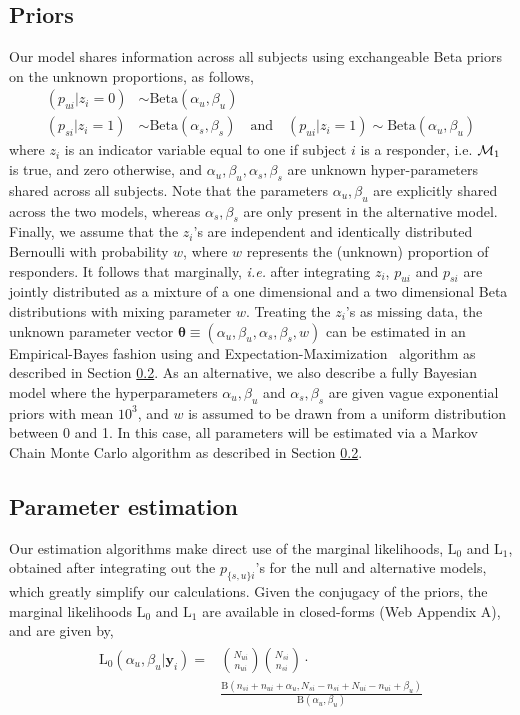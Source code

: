 \documentclass[useAMS,referee,usenatbib]{biom}
\begin{document}
\subsection{Priors}
\label{ss:priors}
Our model shares information across all subjects using exchangeable Beta priors on the unknown proportions, as follows, 
 \begin{align*}
(p_{ui} | z_{i}=0)  &\sim \mathrm{Beta}(\alpha_u, \beta_u)\\
(p_{si} | z_{i}=1)  &\sim \mathrm{Beta}(\alpha_s,\beta_s) \quad\mathrm{and}\quad (p_{ui}|z_{i}=1) \sim \mathrm{Beta}(\alpha_u, \beta_u)
 \end{align*}
where $z_i$ is an indicator variable equal to one if subject $i$ is a responder, i.e.  ${\cal M}_1$ is true, and zero otherwise, and $\alpha_u, \beta_u, \alpha_s,\beta_s$ are unknown hyper-parameters shared across all subjects. Note that the parameters $\alpha_u, \beta_u$ are explicitly shared across the two models, whereas $\alpha_s,\beta_s$ are only present in the alternative model. Finally, we assume that the $z_i$'s are independent and identically distributed Bernoulli with probability $w$, where $w$ represents the (unknown) proportion of responders. It follows that marginally, \textit{i.e.} after integrating $z_i$, $p_{ui}$ and $p_{si}$ are jointly distributed as a mixture of a one dimensional and a two dimensional Beta distributions with mixing parameter $w$. Treating the $z_i$'s as missing data, the unknown parameter vector $\boldsymbol\theta\equiv(\alpha_u, \beta_u, \alpha_s,\beta_s, w)$ can be estimated in an Empirical-Bayes fashion using and Expectation-Maximization~\citep{Dempster:1977ul} algorithm as described in Section \ref{s:estimation}. As an alternative, we also describe a fully Bayesian model where the hyperparameters $\alpha_u, \beta_u$ and $\alpha_s, \beta_s$ are given vague exponential priors with mean $10^3$, and $w$ is assumed to be drawn from a uniform distribution between 0 and 1. In this case, all parameters will be estimated via a Markov Chain Monte Carlo algorithm as described in Section \ref{s:estimation}. 

\subsection{Parameter estimation}
\label{s:estimation}
Our estimation algorithms make direct use of the marginal likelihoods, $\mathrm{L}_0$ and $\mathrm{L}_1$, obtained after integrating out the $p_{\{s,u\}i}$'s for the null and alternative models, which greatly simplify our calculations. Given the conjugacy of the priors, the marginal likelihoods $\mathrm{L}_0$ and $\mathrm{L}_1$ are available in closed-forms (Web Appendix A), and are given by,
 \begin{align*}
 \begin{split}
  	\mathrm{L}_0(\alpha_u,\beta_u|\mathbf{y}_i)
	=&\binom{N_{ui}}{n_{ui}}\binom{N_{si}}{n_{si}}\cdot\\ &\frac{\mathrm{B}(n_{si}+n_{ui}+\alpha_u,N_{si}-n_{si}+N_{ui}-n_{ui}+\beta_u)}{\mathrm{B}(\alpha_u,\beta_u)}
	\end{split}
 \end{align*} 
 
\end{document}
